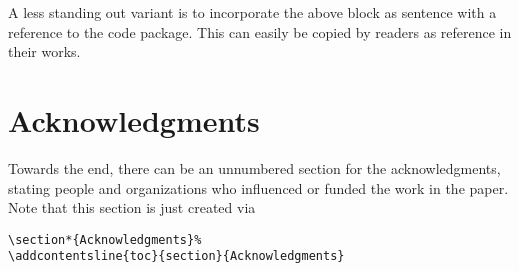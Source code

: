 \documentclass[%
  a4paper,
  twocolumn,
  algotwoe,
]{preprint}
\begin{document}
A less standing out variant is to incorporate the above block as sentence with
a reference to the code package.
This can easily be copied by readers as reference in their works.



\section*{Acknowledgments}%

Towards the end, there can be an unnumbered section for the acknowledgments,
stating people and organizations who influenced or funded the work in the paper.
Note that this section is just created via
\begin{verbatim}
\section*{Acknowledgments}%
\addcontentsline{toc}{section}{Acknowledgments}
\end{verbatim}





  
\end{document}
